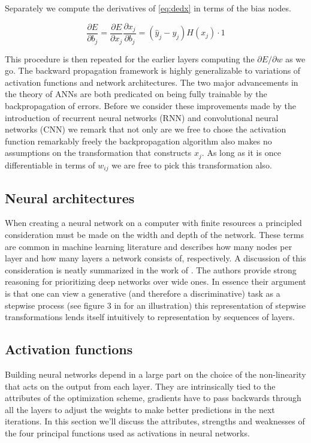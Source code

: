 \noindent Separately we compute the derivatives of \ref{eq:dedx} in terms of the bias nodes.

\begin{equation}
\frac{\partial E}{\partial b_j} = \frac{\partial E}{\partial x_j} \frac{\partial x_j}{\partial b_j} =   (\hat{y}_{j} - y_{j}) H(x_j) \cdot 1
\end{equation}

\noindent This procedure is then repeated for the earlier layers computing the $
\partial E / \partial w $ as we go. The backward propagation framework is highly generalizable to variations of activation functions and network architectures. The two major advancements in the theory of ANNs are both predicated on being fully trainable by the backpropagation of errors. Before we consider these improvements made by the introduction of recurrent neural networks (RNN) and convolutional neural networks (CNN) we remark that not only are we free to chose the activation function remarkably freely the backpropagation algorithm also makes no assumptions on the transformation that constructs $x_j$. As long as it is once differentiable in terms of $w_{ij}$ we are free to pick this transformation also. 

\subsection{Neural architectures}

When creating a neural network on a computer with finite resources a principled consideration must be made on the width and depth of the network. These terms are common in machine learning literature and describes how many nodes per layer and how many layers a network consists of, respectively. A discussion of this consideration is neatly summarized in the work of \citet{Lin2017}. The authors provide strong reasoning for prioritizing deep networks over wide ones. In essence their argument is that one can view a generative (and therefore a discriminative) task as a stepwise process (see figure 3 in \citet{Lin2017} for an illustration) this representation of stepwise transformations lends itself intuitively to representation by sequences of layers.

\subsection{Activation functions}\label{sec:activation}

Building neural networks depend in a large part on the choice of the non-linearity that acts on the output from each layer. They are intrinsically tied to the attributes of the optimization scheme, gradients have to pass backwards through all the layers to adjust the weights to make better predictions in the next iterations. In this section we'll discuss the attributes, strengths and weaknesses of the four principal functions used as activations in neural networks. 